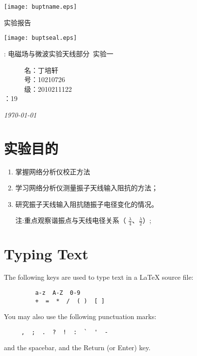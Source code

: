 \documentclass[12pt]{article}
\newcommand{\bigsize}{\fontsize{25pt}{20pt}\selectfont}
\begin{document}
\begin{titlepage}
    \center
\texttt{[image: buptname.eps]}

\begin{spacing}{5}
{\bigsize 实验报告}
\end{spacing}

\texttt{[image: buptseal.eps]}

\begin{spacing}{1}
    \vspace{3cm}
: 电磁场与微波实验天线部分~实验一
    \vspace{3cm}
\end{spacing}

\begin{minipage}{0.23\linewidth}
~~~~~~名：丁培轩 \\
~~~~~~号：10210726\\
~~~~~~级：2010211122\\
：19\\
\end{minipage}

{\small\em \today }
\end{titlepage}

\tableofcontents

\newpage

\section{实验目的}

\begin{enumerate}
  \item 掌握网络分析仪校正方法

  \item 学习网络分析仪测量振子天线输入阻抗的方法；
  \item 研究振子天线输入阻抗随振子电径变化的情况。

      注:重点观察谐振点与天线电径关系（ $\frac{\lambda}{4}$、$\frac{\lambda}{2}$）;

\end{enumerate}

\section{Typing Text}
The following keys are used to type text in a \LaTeX \; source file:
\begin{center}
   \begin{verbatim}
         a-z  A-Z  0-9
         +  =  *  /  ( )  [ ]
   \end{verbatim}
\end{center}
You may also use the following punctuation marks:
\begin{center}
   \begin{verbatim}
     ,  ;  .  ?  !  :  `  '  -
   \end{verbatim}
\end{center}
and the spacebar, and the Return (or Enter) key.\\
\end{document}
